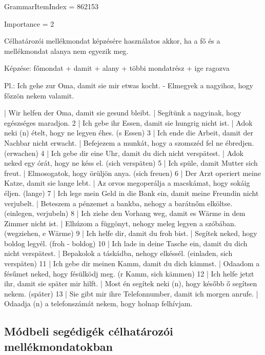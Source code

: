 \documentclass{article}
\newenvironment{desc}{\verbatim}{\endverbatim}
\newenvironment{exmp}{\verbatim}{\endverbatim}
\begin{document}
GrammarItemIndex = 862153

Importance = 2

\begin{desc}
Célhatározói mellékmondat képzésére használatos akkor, ha a fő és a mellékmondat alanya nem egyezik meg.

Képzése:
főmondat + damit + alany + többi mondatrész + ige ragozva

Pl.: Ich gehe zur Oma, damit sie mir etwas kocht. - Elmegyek a nagyihoz, hogy főzzön nekem valamit.
\end{desc}

\begin{exmp}
1 | Wir helfen der Oma, damit sie gesund bleibt. | Segítünk a nagyinak, hogy egészséges maradjon.
2 | Ich gebe ihr Essen, damit sie hungrig nicht ist. | Adok neki (n) ételt, hogy ne legyen éhes. (s Essen)
3 | Ich ende die Arbeit, damit der Nachbar nicht erwacht. | Befejezem a munkát, hogy a szomszéd fel ne ébredjen. (erwachen)
4 | Ich gebe dir eine Uhr, damit du dich nicht verspätest. | Adok neked egy órát, hogy ne késs el. (sich verspäten)
5 | Ich spüle, damit Mutter sich freut. | Elmosogatok, hogy örüljön anya. (sich freuen)
6 | Der Arzt operiert meine Katze, damit sie lange lebt. | Az orvos megoperálja a macskámat, hogy sokáig éljen. (lange)
7 | Ich lege mein Geld in die Bank ein, damit meine Freundin nicht verjubelt. | Beteszem a pénzemet a bankba, nehogy a barátnőm elköltse. (einlegen, verjubeln)
8 | Ich ziehe den Vorhang weg, damit es Wärme in dem Zimmer nicht ist. | Elhúzom a függönyt, nehogy meleg legyen a szóbában. (wegziehen, e Wärme)
9 | Ich helfe dir, damit du froh bist. | Segítek neked, hogy boldog legyél. (froh - boldog)
10 | Ich lade in deine Tasche ein, damit du dich nicht verspätest. | Bepakolok a táskádba, nehogy elkéssél. (einladen, sich verspäten)
11 | Ich gebe dir meinen Kamm, damit du dich kämmst. | Odaadom a fésűmet neked, hogy fésülködj meg. (r Kamm, sich kämmen)
12 | Ich helfe jetzt ihr, damit sie später mir hilft. | Most én segítek neki (n), hogy később ő segítsen nekem. (später)
13 | Sie gibt mir ihre Telefonnumber, damit ich morgen anrufe. | Odaadja (n) a telefonszámát nekem, hogy holnap felhívjam.
\end{exmp}

\subsection{Módbeli segédigék célhatározói mellékmondatokban}
\end{document}
